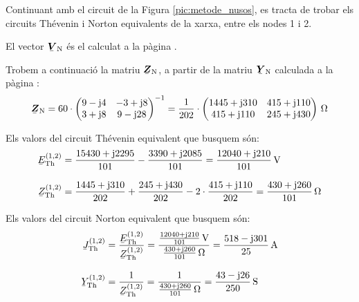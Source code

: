 \begin{exemple}
Continuant amb el circuit de la Figura \vref{pic:metode_nusos}, es tracta de trobar els circuits Th\'{e}venin i Norton equivalents de la xarxa, entre els nodes 1 i 2.

El vector $\mcmplx{V}\ped{N}$ \'{e}s el calculat a la p\`{a}gina \pageref{eq:vn_exemp}.

Trobem a continuaci\'{o} la matriu $\mcmplx{Z}\ped{N}$, a partir de la matriu $\mcmplx{Y}\ped{N}$
calculada a la p\`{a}gina \pageref{eq:yn}:
\[
   \mcmplx{Z}\ped{N} =
   60 \cdot \begin{pmatrix}
            9 - \ju 4 & -3 + \ju 8 \\
            3 + \ju 8 & 9 - \ju 28
      \end{pmatrix} ^{-1} =
   \frac{1}{202} \cdot \begin{pmatrix}
         1445 + \ju 310 & 415 + \ju 110 \\
         415 + \ju 110 & 245 + \ju 430
   \end{pmatrix}\unit{\ohm}
\]

Els valors del circuit Th\'{e}venin equivalent que busquem s\'{o}n:
\begin{align*}
   \cmplx{E}\ped{Th}^{(1,2)} &= \frac{15430 + \ju 2295}{101} - \frac{3390 + \ju 2085}{101} =
   \frac{12040 + \ju 210}{101}\unit{V} \\[2ex]
   \cmplx{Z}\ped{Th}^{(1,2)} &= \frac{1445 + \ju 310}{202} + \frac{245 + \ju 430}{202} -
   2\cdot\frac{415 + \ju 110}{202} = \frac{430 + \ju 260}{101}\unit{\ohm}
\end{align*}

Els valors del circuit Norton equivalent que busquem s\'{o}n:
\begin{align*}
   \cmplx{J}\ped{Th}^{(1,2)} &= \frac{\cmplx{E}\ped{Th}^{(1,2)}}{\cmplx{Z}\ped{Th}^{(1,2)}} =
   \frac{\frac{12040 + \ju 210}{101}\unit{V}}{\frac{430 + \ju 260}{101}\unit{\ohm}} =
   \frac{518 - \ju 301}{25}\unit{A} \\[2ex]
   \cmplx{Y}\ped{Th}^{(1,2)} &= \frac{1}{\cmplx{Z}\ped{Th}^{(1,2)}} =
   \frac{1}{\frac{430 + \ju 260}{101}\unit{\ohm}} = \frac{43 - \ju 26}{250}\unit{S}
\end{align*}

\end{exemple}
